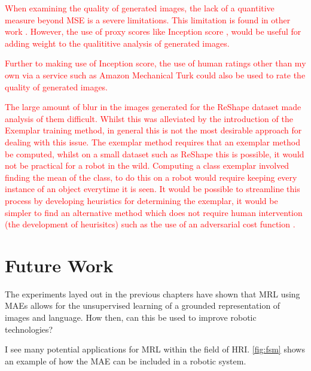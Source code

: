 \textcolor{red}{When examining the quality of generated images, the lack of a quantitive measure beyond \ac{MSE} is a severe limitations. This limitation is found in other work \cite{reed2016generative, zhang2017stackgan, xu2018attngan, li2018video, mansimov2015generating}. However, the use of proxy scores like Inception score \cite{zhang2017}, would be useful for adding weight to the qualititive analysis of generated images.}

\textcolor{red}{Further to making use of Inception score, the use of human ratings other than my own via a service such as Amazon Mechanical Turk could also be used to rate the quality of generated images.}

\textcolor{red}{The large amount of blur in the images generated for the ReShape dataset made analysis of them difficult. Whilst this was alleviated by the introduction of the Exemplar training method, in general this is not the most desirable approach for dealing with this issue. The exemplar method requires that an exemplar method be computed, whilst on a small dataset such as ReShape this is possible, it would not be practical for a robot in the wild. Computing a class exemplar involved finding the mean of the class, to do this on a robot would require keeping every instance of an object everytime it is seen. It would be possible to streamline this process by developing heuristics for determining the exemplar, it would be simpler to find an alternative method which does not require human intervention (the development of heurisitcs) such as the use of an adversarial cost function \cite{reed2016generative}.}

\section{Future Work}
The experiments layed out in the previous chapters have shown that \ac{MRL} using \acp{MAE} allows for the unsupervised learning of a grounded representation of images and language. How then, can this be used to improve robotic technologies?

I see many potential applications for \ac{MRL} within the field of \ac{HRI}. \autoref{fig:fsm} shows an example of how the \ac{MAE} can be included in a robotic system.


